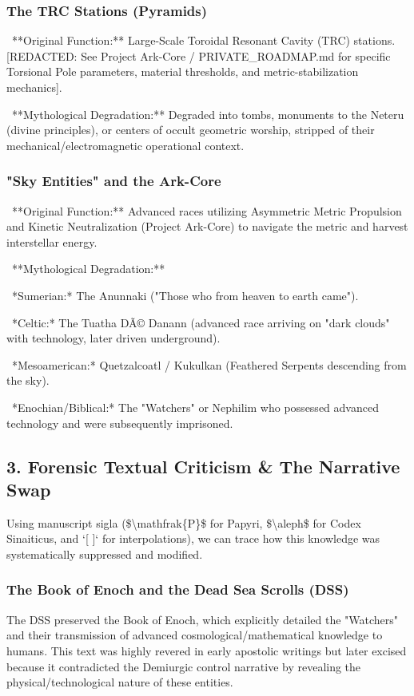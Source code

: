 \documentclass[aps,prd,11pt,onecolumn,superscriptaddress,nofootinbib,floatfix]{revtex4-2}
\begin{document}
\subsubsection{The TRC Stations (Pyramids)}
\textbullet~**Original Function:** Large-Scale Toroidal Resonant Cavity (TRC) stations. [REDACTED: See Project Ark-Core / PRIVATE\_ROADMAP.md for specific Torsional Pole parameters, material thresholds, and metric-stabilization mechanics].

\textbullet~**Mythological Degradation:** Degraded into tombs, monuments to the Neteru (divine principles), or centers of occult geometric worship, stripped of their mechanical/electromagnetic operational context.



\subsubsection{"Sky Entities" and the Ark-Core}
\textbullet~**Original Function:** Advanced races utilizing Asymmetric Metric Propulsion and Kinetic Neutralization (Project Ark-Core) to navigate the metric and harvest interstellar energy.

\textbullet~**Mythological Degradation:**

\textbullet~*Sumerian:* The Anunnaki ("Those who from heaven to earth came").

\textbullet~*Celtic:* The Tuatha DÃ© Danann (advanced race arriving on "dark clouds" with technology, later driven underground).

\textbullet~*Mesoamerican:* Quetzalcoatl / Kukulkan (Feathered Serpents descending from the sky).

\textbullet~*Enochian/Biblical:* The "Watchers" or Nephilim who possessed advanced technology and were subsequently imprisoned.



\subsection{3. Forensic Textual Criticism \& The Narrative Swap}
Using manuscript sigla (\$\textbackslash{}mathfrak\{P\}\$ for Papyri, \$\textbackslash{}aleph\$ for Codex Sinaiticus, and `[ ]` for interpolations), we can trace how this knowledge was systematically suppressed and modified.


\subsubsection{The Book of Enoch and the Dead Sea Scrolls (DSS)}
The DSS preserved the Book of Enoch, which explicitly detailed the "Watchers" and their transmission of advanced cosmological/mathematical knowledge to humans. This text was highly revered in early apostolic writings but later excised because it contradicted the Demiurgic control narrative by revealing the physical/technological nature of these entities.
\end{document}
